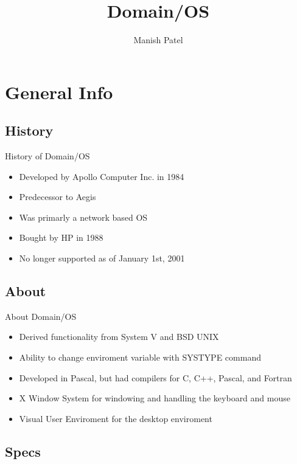 \documentclass{beamer}
\title[Domain/OS] 
{Domain/OS}
\author[Manish Patel] 
{Manish Patel}
\institute[Loyola University in Chicago] %
{
   Department of Computer Science\\
  Loyola University in Chicago
}
\date[12/14/12]
\begin{document}
\begin{frame}
  \titlepage
\end{frame}


\section{General Info}

\subsection{History}

\begin{frame}{History of Domain/OS}
  	\begin{itemize}
  	\item Developed by Apollo Computer Inc. in 1984
  	\item Predecessor to Aegis
  	\item Was primarly a network based OS
  	\item Bought by HP in 1988
  	\item No longer supported as of January 1st, 2001
  	\end{itemize}
 \end{frame}

\subsection{About}

\begin{frame}{About Domain/OS}
	\begin{itemize}
	\item Derived functionality from System V and BSD UNIX
	\item Ability to change enviroment variable with SYSTYPE command
	\item Developed in Pascal, but had compilers for C, C++, Pascal, and Fortran
	\item X Window System for windowing and handling the keyboard and mouse
	\item Visual User Enviroment for the desktop enviroment 
	\end{itemize}
\end{frame}

\subsection{Specs}
\end{document}
